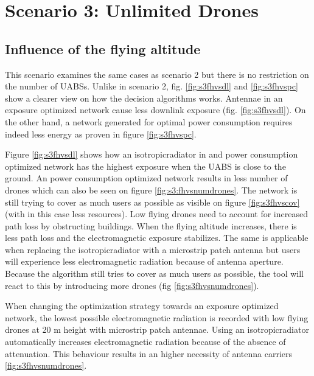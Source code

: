 \section{Scenario 3: Unlimited Drones}
\subsection{Influence of the flying altitude}

This scenario examines the same cases as scenario 2 but there is no restriction on the number of \gls{UABS}s. 
Unlike in scenario 2, fig. \ref{fig:s3fhvsdl} and \ref{fig:s3fhvspc} show a clearer view on how the decision algorithms
works. Antennae in an exposure optimized network cause less downlink exposure (fig. \ref{fig:s3fhvsdl}). On the other hand, 
a network generated for optimal power consumption requires indeed less energy as proven in figure \ref{fig:s3fhvspc}. 

Figure \ref{fig:s3fhvsdl} shows how an \gls{isotropicradiator} in and power consumption optimized network has the highest exposure when 
the \gls{UABS}  is close to the ground. An power consumption optimized network results in less number of drones which can also be seen 
on figure \ref{fig:s3:fhvsnumdrones}. The network is still trying to cover as much users as possible as visible on figure 
\ref{fig:s3fhvscov} (with in this case less resources). Low flying drones need to account for increased path loss by obstructing buildings.
When the flying altitude increases, there is less path loss and the electromagnetic exposure stabilizes. The same is applicable when replacing
the \gls{isotropicradiator} with a microstrip patch antenna but users will experience less electromagnetic radiation 
because of antenna aperture. Because the algorithm still tries to cover as much users as possible, the tool will react to this by 
introducing more drones (fig \ref{fig:s3fhvsnumdrones}).

When changing the optimization strategy towards an exposure optimized network, the lowest possible electromagnetic radiation is recorded
with low flying drones at 20 m height with microstrip patch antennae. Using an \gls{isotropicradiator} automatically increases electromagnetic 
radiation because of the absence of attenuation. This behaviour results in an higher necessity of antenna carriers \ref{fig:s3fhvsnumdrones}.


